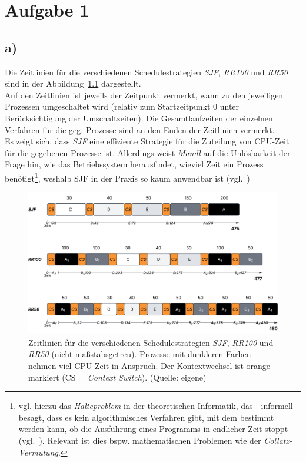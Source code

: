 \chapter{Aufgabe 1}

\section{a)}

Die Zeitlinien für die verschiedenen Schedulestrategien \textit{SJF}, \textit{RR100} und \textit{RR50} sind in der Abbildung~\ref{fig:zeitlinie} dargestellt.\\
Auf den Zeitlinien ist jeweils der Zeitpunkt vermerkt, wann zu den jeweiligen Prozessen umgeschaltet wird (relativ zum Startzeitpunkt $0$ unter Berücksichtigung der Umschaltzeiten).
Die Gesamtlaufzeiten der einzelnen Verfahren für die geg. Prozesse sind an den Enden der Zeitlinien vermerkt.\\

\noindent
Es zeigt sich, dass \textit{SJF} eine effiziente Strategie für die Zuteilung von CPU-Zeit für die gegebenen Prozesse ist.
Allerdings weist \textit{Mandl} auf die Unlösbarkeit der Frage hin, wie das Betriebssystem herausfindet, wieviel Zeit ein Prozess benötigt\footnote{
vgl. hierzu das \textit{Halteproblem} in der theoretischen Informatik, das - informell - besagt, dass es kein algorithmisches Verfahren gibt, mit dem bestimmt werden kann, ob die Ausführung eines Programms in endlicher Zeit stoppt (vgl.~\cite[363 ff.]{VW16j}). Relevant ist dies bspw. mathematischen Problemen wie der \textit{Collatz-Vermutung}.
}, weshalb SJF in der Praxis so kaum anwendbar ist (vgl.~\cite[104]{Man20f})

\begin{figure}
    \centering
    \includegraphics[scale=0.35]{aufgabe 1/img/zeitlinie.svg}
    \caption{Zeitlinien für die verschiedenen Schedulestrategien \textit{SJF}, \textit{RR100} und \textit{RR50} (nicht maßstabsgetreu). Prozesse mit dunkleren Farben nehmen viel CPU-Zeit in Anspruch. Der Kontextwechsel ist orange markiert (CS = \textit{Context Switch}). (Quelle: eigene)}
    \label{fig:zeitlinie}
\end{figure}

